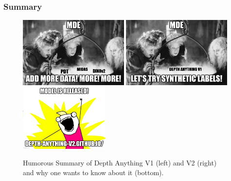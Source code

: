 \documentclass[12pt]{beamer}
\begin{document}
\begin{frame}
    \frametitle{Summary}
    
        
    \begin{figure}
        \centering
        \includegraphics[width=0.49\textwidth]{./figures/summary_v1.jpg}
        \includegraphics[width=0.49\textwidth]{./figures/summary_v2.jpeg}
        \includegraphics[width=0.4\textwidth]{./figures/summary_action.jpeg}
        \caption{Humorous Summary of Depth Anything V1 (left) and V2 (right) and why one wants to know about it (bottom).}
        \label{fig:summary}
    \end{figure}
\end{frame}
\end{document}
